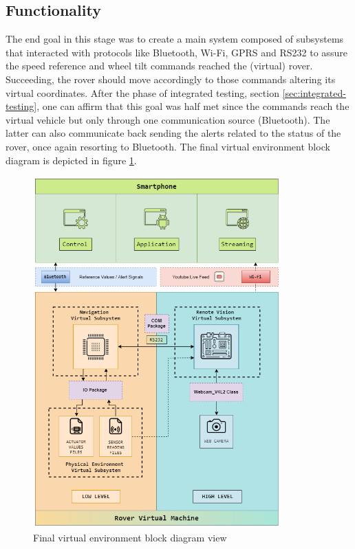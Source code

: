 \subsection{Functionality}
\label{functionality}
%
The end goal in this stage was to create a main system composed of subsystems that interacted with protocols like Bluetooth, Wi-Fi, GPRS and RS232 to assure the speed reference and wheel tilt commands reached the (virtual) rover. Succeeding, the rover should move accordingly to those commands altering its virtual coordinates. After the phase of integrated testing, section \ref{sec:integrated-testing}, one can affirm that this goal was half met since the commands reach the virtual vehicle but only through one communication source (Bluetooth). The latter can also communicate back sending the alerts related to the status of the rover, once again resorting to Bluetooth. The final  
virtual environment block diagram is depicted in figure \ref{fig:final-diagram}.
%
\begin{figure}[!ht]
\centering
\includegraphics[width=0.85\textwidth]{img/functionality.png}
\caption{\label{fig:final-diagram}Final  
virtual environment block diagram view}
\end{figure}
%
